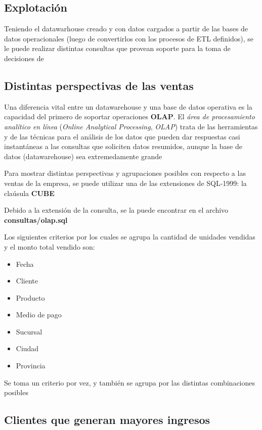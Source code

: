 \subsection{Explotación}

Teniendo el datawarhouse creado y con datos cargados a partir de las bases de datos operacionales (luego de convertirlos con los procesos de ETL definidos), se le puede realizar distintas consultas que provean soporte para la toma de decisiones de 

\subsection{Distintas perspectivas de las ventas}

Una diferencia vital entre un datawarehouse y una base de datos operativa es la capacidad del primero de soportar operaciones \textbf{OLAP}. El \emph{área de procesamiento analítico en línea} (\emph{Online Analytical Processing}, \emph{OLAP}) trata de las herramientas y de las técnicas para el análisis de los datos que pueden dar respuestas casi instantáneas a las consultas que soliciten datos resumidos, aunque la base de datos (datawarehouse) sea extremedamente grande \autocite{silberschatz-olap}

Para mostrar distintas perspectivas y agrupaciones posibles con respecto a las ventas de la empresa, se puede utilizar una de las extensiones de SQL-1999: la claúsula \textbf{CUBE} 

Debido a la extensión de la consulta, se la puede encontrar en el archivo \textbf{consultas/olap.sql} 

Los siguientes criterios por los cuales se agrupa la cantidad de unidades vendidas y el monto total vendido son:

\begin{itemize}
    \item Fecha
    \item Cliente
    \item Producto
    \item Medio de pago
    \item Sucursal
    \item Ciudad
    \item Provincia
\end{itemize}

Se toma un criterio por vez, y también se agrupa por las distintas combinaciones posibles



\subsection{Clientes que generan mayores ingresos}

